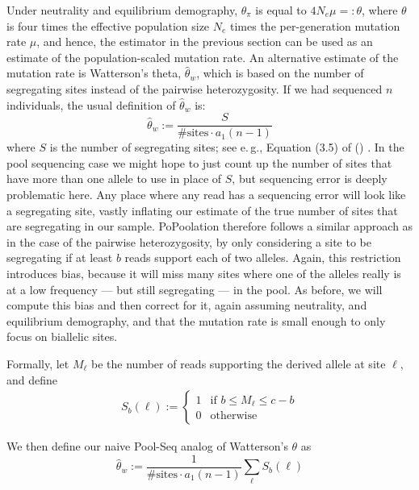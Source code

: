 \documentclass[a4paper,fontsize=9pt,DIV=14]{scrartcl}
\newcommand\citeay[1]{\citeauthor{#1} (\citeyear{#1}) \cite{#1}}
\newcommand{\samplesize}{n}
\newcommand{\coverage}{c}
\begin{document}
Under neutrality and equilibrium demography, $\theta_\pi$ is equal to $4N_e\mu =: \theta$, where $\theta$ is four times the effective population size $N_e$ times the per-generation mutation rate $\mu$, and hence, the estimator in the previous section can be used as an estimate of the population-scaled mutation rate.  An alternative estimate of the mutation rate is Watterson's theta, $\widehat{\theta}_w$, which is based on the number of segregating sites instead of the pairwise heterozygosity.  If we had sequenced $n$ individuals, the usual definition of $\widehat{\theta}_w$ is:
\[
\widehat{\theta}_w := \frac{S}{\text{\# sites} \cdot a_1(n-1) }
\]
where $S$ is the number of segregating sites; see e.\,g., Equation (3.5) of \citeay{Hahn2018}. In the pool sequencing case we might hope to just count up the number of sites that have more than one allele to use in place of $S$, but sequencing error is deeply problematic here.  Any place where any read has a sequencing error will look like a segregating site, vastly inflating our estimate of the true number of sites that are segregating in our sample.  PoPoolation therefore follows a similar approach as in the case of the pairwise heterozygosity, by only considering a site to be segregating if at least $b$ reads support each of two alleles.  Again, this restriction introduces bias, because it will miss many sites where one of the alleles really is at a low frequency --- but still segregating --- in the pool.  As before, we will compute this bias and then correct for it, again assuming neutrality, and equilibrium demography, and that the mutation rate is small enough to only focus on biallelic sites.


Formally, let $M_\ell$ be the number of reads supporting the derived allele at site $\ell$, and define
\begin{align}
    S_b(\ell) :=
    \begin{cases}
        1 & \text{if } b \le M_\ell \le \coverage-b
        \\
        0 & \text{otherwise}
    \end{cases}
\end{align}
%

We then define our naive Pool-Seq analog of Watterson's $\theta$ as
\[
\widehat{\theta}_w :=\frac{1}{\text{\# sites} \cdot a_1(\samplesize-1)}\sum_{\ell} S_b(\ell)
\]
\end{document}
